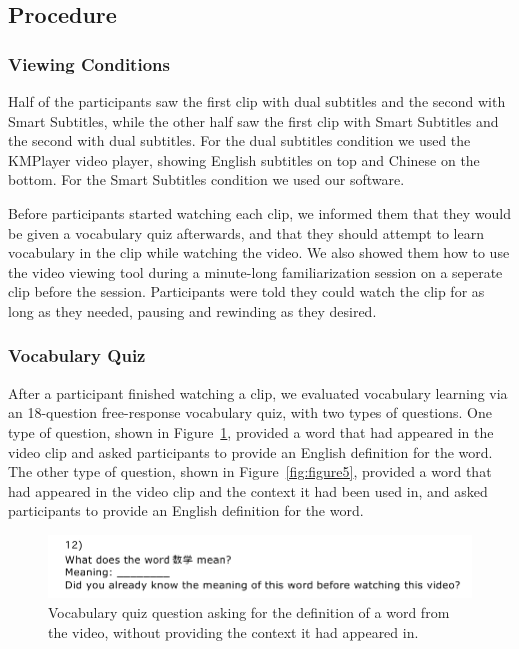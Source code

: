 \documentclass{sigchi}
\begin{document}
\pagebreak

\subsection{Procedure}

\subsubsection{Viewing Conditions}

Half of the participants saw the first clip with dual
subtitles and the second with Smart Subtitles, while the
other half saw the first clip with Smart Subtitles and
the second with dual subtitles.
For the dual subtitles
condition we used the KMPlayer video player, showing English subtitles
on top and Chinese on the bottom. For the Smart
Subtitles condition we used our software.

Before participants started watching each clip, we
informed them that they would be given a vocabulary
quiz afterwards, and that they should attempt to learn vocabulary
in the clip while watching the video. We also
showed them how to use the video viewing tool
during a minute-long familiarization session on a seperate clip
before the session. Participants were told 
they could watch the clip for as long as they
needed, pausing and rewinding as they desired.

\subsubsection{Vocabulary Quiz}

After a participant finished watching a clip, we evaluated vocabulary learning via an 18-question free-response vocabulary quiz, with two types of questions. One type of question, shown in Figure~\ref{fig:figure4}, provided a word that had appeared in the video clip and asked participants to provide an English definition for the word. The other type of question, shown in Figure~\ref{fig:figure5}, provided a word that had appeared in the video clip and the context it had been used in, and asked participants to provide an English definition for the word.

\begin{figure}[!h]
\centering
\includegraphics[width=\columnwidth]{vocab-quiz-1}
\caption{Vocabulary quiz question asking for the definition
of a word from the video, without providing the context it had appeared in.}
\label{fig:figure4}
\end{figure}
\end{document}
